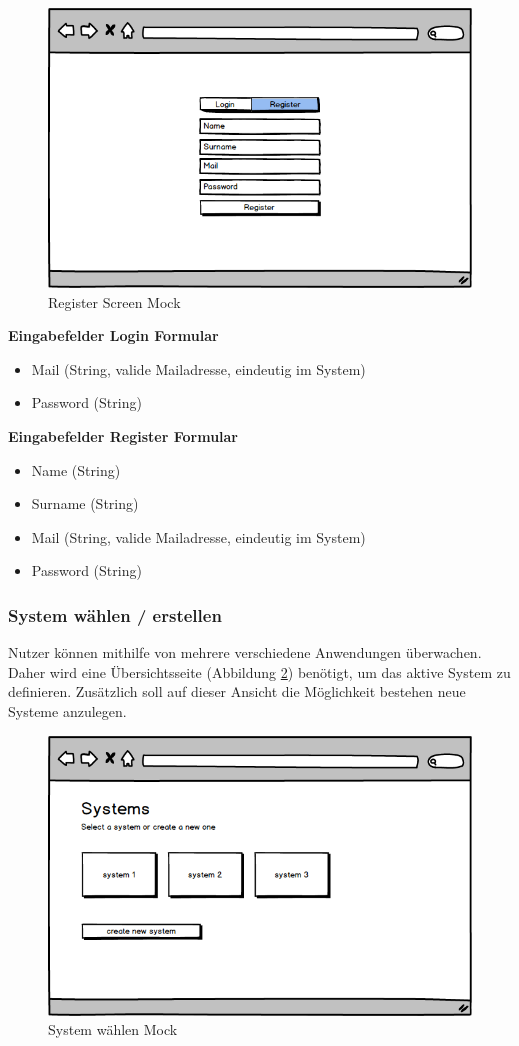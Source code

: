\begin{figure}[h]
 \centering
 \includegraphics[width=0.7\linewidth]{kapitel1/mocks/Register.png}
 \caption{Register Screen Mock}
  \label{fig:register}
\end{figure}


\textbf{Eingabefelder Login Formular}
\begin{itemize}
\item Mail (String, valide Mailadresse, eindeutig im System)
\item Password (String)
\end{itemize}

\textbf{Eingabefelder Register Formular}
\begin{itemize}
\item Name (String)
\item Surname (String)
\item Mail (String, valide Mailadresse, eindeutig im System)
\item Password (String)
\end{itemize}



\subsubsection{System wählen / erstellen}

Nutzer können mithilfe von \projectname{} mehrere verschiedene Anwendungen überwachen.
Daher wird eine Übersichtsseite (Abbildung \ref{fig:system-picker}) benötigt,
um das aktive System zu definieren. Zusätzlich soll auf dieser Ansicht die Möglichkeit bestehen neue Systeme anzulegen.

\vspace{0.3cm}

\begin{figure}[h]
 \centering
 \includegraphics[width=0.6\linewidth]{kapitel1/mocks/system-picker.png}
 \caption{System wählen Mock}
 \label{fig:system-picker}
\end{figure}

